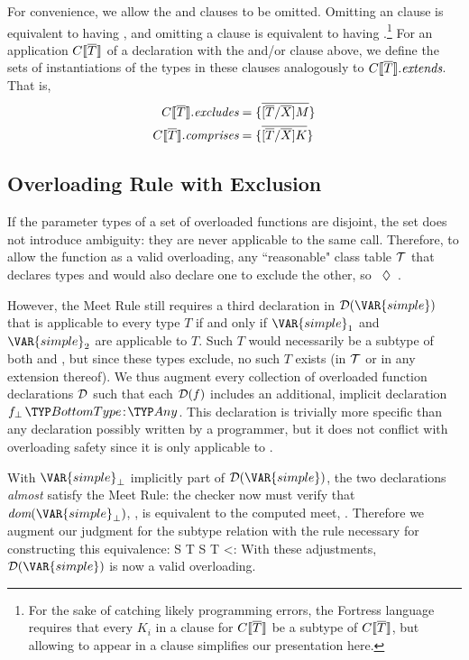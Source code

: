 For convenience, 
we allow the  and  clauses to be omitted.
Omitting an  clause is equivalent to having , and
omitting a  clause is equivalent to having .\footnote{For
the sake of catching likely programming errors, the Fortress language requires that every $K_i$
in a  clause for $C\llbracket \overline{T} \rrbracket$ be a subtype of $C\llbracket \overline{T} \rrbracket$, but allowing
 to appear in a  clause simplifies our presentation here.}
For an application $C\llbracket \overline{T} \rrbracket$ 
of a declaration with the  and/or  clause above, 
we define the sets of instantiations of the types 
in these clauses analogously to ${C\llbracket \overline{T} \rrbracket}.\textit{extends}$.
That is,\\[-.2em]
\begin{align*}
{C\ensuremath{\llbracket \overline{T} \rrbracket}}.\textit{excludes}  &= \{ \overline{[\overline{T}/\overline{X}]M} \} \\
{C\llbracket \overline{T} \rrbracket}.\textit{comprises} &= \{ \overline{[\overline{T}/\overline{X}]K} \}
\end{align*}


\subsection{Overloading Rule with Exclusion}\label{sec:exc-rules}
If the parameter types of a set of overloaded functions are disjoint,
the set does not introduce ambiguity: they are never applicable to the same call.
Therefore, to allow the function  as a valid overloading,
any ``reasonable" class table $\mathcal{T}$ that declares types  and  would also
declare one to exclude the other, so \hbox{ $\mathrel{\lozenge}$ }.

However, the Meet Rule still requires a third declaration in $\D(\VAR{simple})$ that is applicable
to every type $T$ if and only if $\VAR{simple}_1$ and $\VAR{simple}_2$ are applicable to $T$.
Such $T$ would necessarily be a subtype of both  and , but since
these types exclude, no such $T$ exists (in $\mathcal{T}$ or in any extension thereof).
We thus augment every collection of overloaded function declarations $\mathcal{D}$ such
that each $\mathcal{D}(f)$ includes an additional, implicit declaration $\decl{f_\bot}{\BottomType}{\Any}$.
This declaration is trivially more specific than any declaration possibly written
by a programmer, but it does not conflict with overloading safety since it is
only applicable to \BottomType.

With $\VAR{simple}_\bot$ implicitly part of $\D(\VAR{simple})$, the two 
declarations \emph{almost} satisfy the Meet Rule: the checker now must verify
that $\textit{dom}(\VAR{simple}_\bot)$, \BottomType, is equivalent to the computed meet,
. Therefore we augment our judgment for the subtype relation
with the rule necessary for constructing this equivalence:
\infrule
{S \;\exc\; T}
{\Delta \vdash S \cap T <: \BottomType}
With these adjustments, $\D(\VAR{simple})$ is now a valid overloading.
